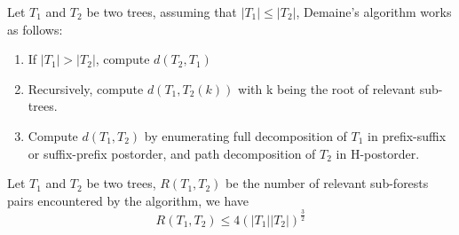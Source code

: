 Let $T_1$ and $T_2$ be two trees, assuming that $\left\vert T_1 \right\vert \leq \left\vert T_2 \right\vert$, Demaine's algorithm works as follows:

\begin{enumerate}
\item If $\left\vert T_1 \right\vert > \left\vert T_2 \right\vert$, compute $d(T_2, T_1)$
\item Recursively, compute $d(T_1, T_2(k))$ with k being the root of relevant sub-trees.
\item Compute $d(T_1, T_2)$ by enumerating full decomposition of $T_1$ in prefix-suffix or suffix-prefix postorder, and path decomposition of $T_2$ in H-postorder.
\end{enumerate}
\begin{lemma}
Let $T_1$ and $T_2$ be two trees, $R(T_1, T_2)$ be the number of relevant sub-forests pairs encountered by the algorithm, we have
\begin{equation*}
R(T_1, T_2) \leq 4(\left\vert T_1 \right\vert \left\vert T_2 \right\vert)^{\frac{3}{2}}
\end{equation*}
\end{lemma}
